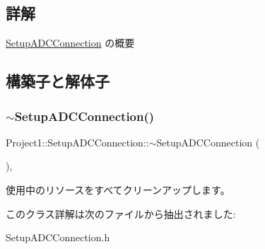 \subsection{詳解}
\hyperlink{class_project1_1_1_setup_a_d_c_connection}{Setup\+A\+D\+C\+Connection} の概要 



\subsection{構築子と解体子}
\mbox{\label{class_project1_1_1_setup_a_d_c_connection_a866e7e75c329629e9f2d18ff382a7dc4}} 
\subsubsection{\texorpdfstring{$\sim$\+Setup\+A\+D\+C\+Connection()}{~SetupADCConnection()}}
{\footnotesize\ttfamily Project1\+::\+Setup\+A\+D\+C\+Connection\+::$\sim$\+Setup\+A\+D\+C\+Connection (\begin{DoxyParamCaption}{ }\end{DoxyParamCaption})\hspace{0.3cm}{\ttfamily [inline]}, {\ttfamily [protected]}}



使用中のリソースをすべてクリーンアップします。 



このクラス詳解は次のファイルから抽出されました\+:\begin{DoxyCompactItemize}
\item 
Setup\+A\+D\+C\+Connection.\+h\end{DoxyCompactItemize}
